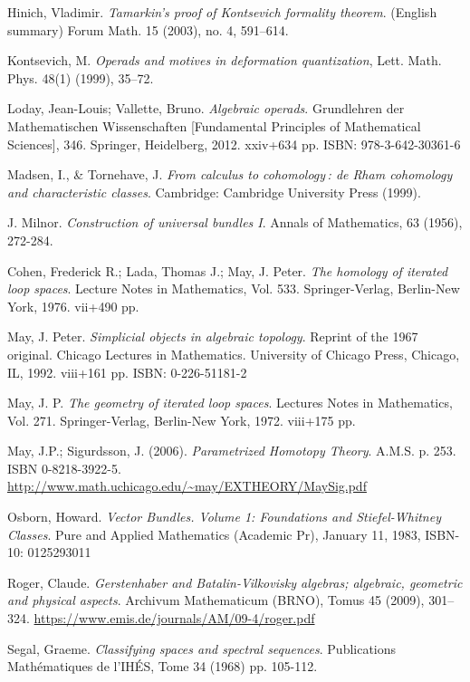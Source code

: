 \documentclass[TFM.tex]{subfiles}
\begin{document}
\begin{thebibliography}{}
 Hinich, Vladimir. \emph{Tamarkin's proof of Kontsevich formality theorem}. (English summary) 
Forum Math. 15 (2003), no. 4, 591–614. 


 Kontsevich, M. \emph{Operads and motives in deformation quantization}, Lett. Math. Phys.
48(1) (1999), 35–72.


 Loday, Jean-Louis; Vallette, Bruno. \emph{Algebraic operads}. Grundlehren der Mathematischen Wissenschaften [Fundamental Principles of Mathematical Sciences], 346. Springer, Heidelberg, 2012. xxiv+634 pp. ISBN: 978-3-642-30361-6

 Madsen, I., \& Tornehave, J. \emph{From calculus to cohomology : de Rham cohomology and characteristic classes}. Cambridge: Cambridge University Press (1999).

 J. Milnor. \emph{Construction of universal bundles I}. Annals of Mathematics, 63 (1956), 272-284. %


 Cohen, Frederick R.; Lada, Thomas J.; May, J. Peter. \emph{The homology of iterated loop spaces}. Lecture Notes in Mathematics, Vol. 533. Springer-Verlag, Berlin-New York, 1976. vii+490 pp. %


  May, J. Peter. \emph{Simplicial objects in algebraic topology}. Reprint of the 1967 original. Chicago Lectures in Mathematics. University of Chicago Press, Chicago, IL, 1992. viii+161 pp. ISBN: 0-226-51181-2


 May, J. P.
\emph{The geometry of iterated loop spaces}. 
Lectures Notes in Mathematics, Vol. 271. Springer-Verlag, Berlin-New York, 1972. viii+175 pp. 


 May, J.P.; Sigurdsson, J. (2006). \emph{Parametrized Homotopy Theory}. A.M.S. p. 253. ISBN 0-8218-3922-5. \url{http://www.math.uchicago.edu/~may/EXTHEORY/MaySig.pdf}


 Osborn, Howard. \emph{Vector Bundles. Volume 1: Foundations and Stiefel-Whitney Classes}. Pure and Applied Mathematics (Academic Pr), January 11, 1983, ISBN-10: 0125293011


 Roger, Claude. \emph{Gerstenhaber and Batalin-Vilkovisky algebras; algebraic, geometric and physical aspects}. Archivum Mathematicum (BRNO), Tomus 45 (2009), 301–324. \url{https://www.emis.de/journals/AM/09-4/roger.pdf}


 Segal, Graeme. \emph{Classifying spaces and spectral sequences}. Publications Mathématiques de l'IHÉS, Tome 34 (1968) pp. 105-112.


\end{thebibliography}
\end{document}
